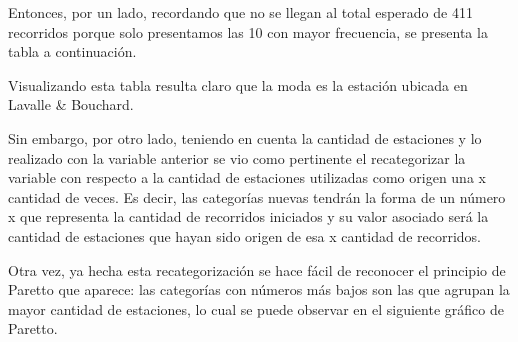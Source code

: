 \documentclass[11pt]{article}
\begin{document}
    Entonces, por un lado, recordando que no se llegan al total esperado de 411 recorridos porque solo presentamos las 10 con mayor frecuencia, se presenta la tabla a continuaci\'on. 




    Visualizando esta tabla resulta claro que la moda es la estaci\'on ubicada en Lavalle \& Bouchard. 

    Sin embargo, por otro lado, teniendo en cuenta la cantidad de estaciones y lo realizado con la variable anterior se vio como pertinente el recategorizar la variable 
    con respecto a la cantidad de estaciones utilizadas como origen una x cantidad de veces. Es decir, 
    las categor\'ias nuevas tendr\'an la forma de un n\'umero x que representa la cantidad de recorridos iniciados y su valor
    asociado ser\'a la cantidad de estaciones que hayan sido origen de esa x cantidad de recorridos. 

    Otra vez, ya hecha esta recategorizaci\'on se hace f\'acil de reconocer el principio de Paretto que aparece: las categor\'ias con n\'umeros m\'as bajos son las que 
    agrupan la mayor cantidad de estaciones, lo cual se puede observar en el siguiente gr\'afico de Paretto. 
\end{document}
